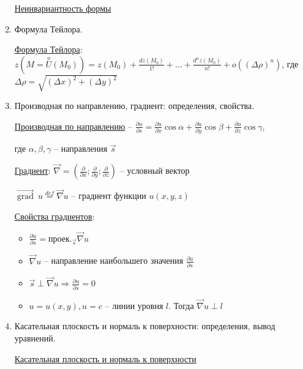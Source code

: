 \documentclass[12pt]{article}
\begin{document}
\begin{enumerate}
        \hyperlink{noninvariantofseconddifferentialoffunctionoftwovariables}{Неинвариантность формы}

        \item Формула Тейлора.

        \hyperlink{formulataylor}{Формула Тейлора}: $\displaystyle z(M = \stackrel{o}{U}(M_0)) = z(M_0) + \frac{dz(M_0)}{1!} + \dots + \frac{d^n z(M_0)}{n!} + o((\Delta \rho)^n)$,
        где $\Delta \rho = \sqrt{(\Delta x)^2 + (\Delta y)^2}$

        \item Производная по направлению, градиент: определения, свойства.

        \hyperlink{derivativeoffunctionindirection}{Производная по направлению} -- $\frac{\partial u}{\partial s} = \frac{\partial u}{\partial x} \cos\alpha + \frac{\partial u}{\partial y} \cos\beta + \frac{\partial u}{\partial z} \cos\gamma$,

        где $\alpha, \beta, \gamma$ -- направления $\overrightarrow{s}$

        \hyperlink{gradientdefinition}{Градиент}: $\vec\nabla = \left(\frac{\partial}{\partial x}; \frac{\partial}{\partial y}; \frac{\partial}{\partial z}\right)$ -- условный вектор

        $\overrightarrow{\operatorname{grad}} \ u \stackrel{def}{=} \vec\nabla u$ -- градиент функции $u(x, y, z)$

        \hyperlink{gradientproperties}{Свойства градиентов}:

        \begin{itemize}
            \item $\frac{\partial u}{\partial s} = \text{проек.}_{\overrightarrow{s}} \vec\nabla u$

            \item $\vec\nabla u$ -- направление наибольшего значения $\frac{\partial u}{\partial s}$

            \item $\overrightarrow{s} \perp \vec\nabla u \Longrightarrow \frac{\partial u}{\partial s} = 0$

            \item $u = u(x, y), u = c$ -- линии уровня $l$. Тогда $\vec\nabla u \perp l$
        \end{itemize}


        \item Касательная плоскость и нормаль к поверхности: определения, вывод уравнений.

        \hyperlink{tangentandnormaltosurface}{Касательная плоскость и нормаль к поверхности}


\end{enumerate}
\end{document}
